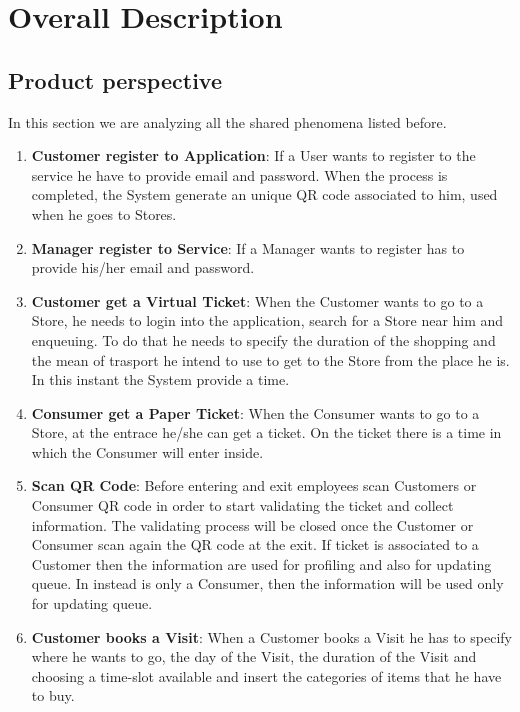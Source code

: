 \documentclass[a4paper, 12pt, oneside]{article}
\begin{document}
\newpage
\section{Overall Description}
\label{overallDescription}

\subsection{Product perspective}
In this section we are analyzing all the shared phenomena listed before.
\begin{enumerate}
\item \textbf{Customer register to Application}: If a User wants to register to the service he have to provide email and password.
When the process is completed, the System generate an unique QR code associated to him, used when he goes to Stores.

\item \textbf{Manager register to Service}: If a Manager wants to register has to provide his/her email and password. 

\item \textbf{Customer get a Virtual Ticket}: When the Customer wants to go to a Store, he needs to login into the application, search for a Store near him and enqueuing. To do that he needs to specify the duration of the shopping and the mean of trasport he intend to use to get to the Store from the place he is. In this instant the System provide a time.

\item \textbf{Consumer get a Paper Ticket}:  When the Consumer wants to go to a Store, at the entrace he/she can get a ticket. On the ticket there is a time in which the Consumer will enter inside.

\item \textbf{Scan QR Code}: Before entering and exit employees scan Customers or Consumer QR code in order to start validating the ticket and collect information. The validating process will be closed once the Customer or Consumer scan again the QR code at the exit.
If ticket is associated to a Customer then the information are used for profiling and also for updating queue. In instead is only a Consumer, then the information will be used only for updating queue.

\item \textbf{Customer books a Visit}: When a Customer books a Visit he has to specify where he wants to go, the day of the Visit, the duration of the Visit and choosing a time-slot available and insert the categories of items that he have to buy. 


\end{enumerate}
\end{document}
